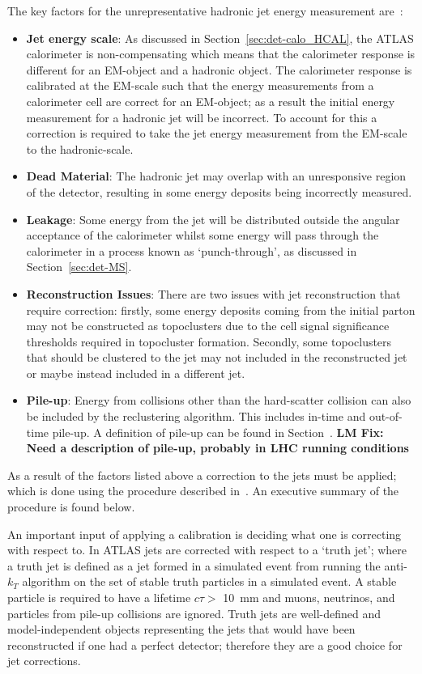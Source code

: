 \noindent
The key factors for the unrepresentative hadronic jet energy measurement are~\cite{det-thesis_kate,obj-bjets_algo_2015}:
\begin{itemize}
\item\textbf{Jet energy scale}:
  As discussed in Section~\ref{sec:det-calo_HCAL}, the ATLAS calorimeter is non-compensating which means that
  the calorimeter response is different for an EM-object and a hadronic object.
  The calorimeter response is calibrated at the EM-scale such that the energy measurements from a calorimeter cell
  are correct for an EM-object;
  as a result the initial energy measurement for a hadronic jet will be incorrect.
  To account for this a correction is required to take the jet energy measurement from the EM-scale to the hadronic-scale.
\item\textbf{Dead Material}:
  The hadronic jet may overlap with an unresponsive region of the detector,
  resulting in some energy deposits being incorrectly measured.
\item\textbf{Leakage}:
  Some energy from the jet will be distributed outside the angular acceptance of the calorimeter
  whilst some energy will pass through the calorimeter in a process known as `punch-through', as discussed in Section~\ref{sec:det-MS}.
\item\textbf{Reconstruction Issues}:
  There are two issues with jet reconstruction that require correction:
  firstly, some energy deposits coming from the initial parton may not be constructed as topoclusters due to the cell signal significance thresholds required in topocluster formation.
  Secondly, some topoclusters that should be clustered to the jet may not included in the reconstructed jet or maybe instead included in a different jet.
\item\textbf{Pile-up}:
  Energy from collisions other than the hard-scatter collision can also be included by the reclustering algorithm.
  This includes in-time and out-of-time pile-up.
  A  definition of pile-up can be found in Section~\cite{}. \textbf{LM Fix: Need a description of pile-up, probably in LHC running conditions}
\end{itemize}

As a result of the factors listed above a correction to the jets must be applied;
which is done using the procedure described in~\cite{obj-jets_calib_run2}.
An executive summary of the procedure is found below.

An important input of applying a calibration is deciding what one is correcting with respect to.
In ATLAS jets are corrected with respect to a `truth jet';
where a truth jet is defined as a jet formed in a simulated event from running the anti-$k_T$ algorithm on the set of stable truth particles in a simulated event.
A stable particle is required to have a lifetime $c\tau >$ \SI{10}{\milli\metre} and muons, neutrinos, and particles from pile-up collisions are ignored.
Truth jets are well-defined and model-independent objects representing the jets that would have been reconstructed if one had a perfect detector;
therefore they are a good choice for jet corrections.


